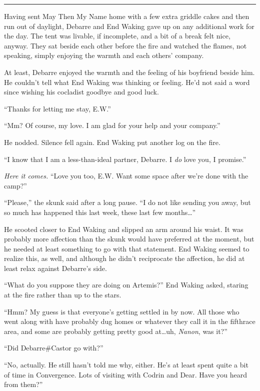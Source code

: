 \begin{center}\rule{0.5\linewidth}{0.5pt}\end{center}

Having sent May Then My Name home with a few extra griddle cakes and then run out of daylight, Debarre and End Waking gave up on any additional work for the day. The tent was livable, if incomplete, and a bit of a break felt nice, anyway. They sat beside each other before the fire and watched the flames, not speaking, simply enjoying the warmth and each others' company.

At least, Debarre enjoyed the warmth and the feeling of his boyfriend beside him. He couldn't tell what End Waking was thinking or feeling. He'd not said a word since wishing his cocladist goodbye and good luck.

``Thanks for letting me stay, E.W.''

``Mm? Of course, my love. I am glad for your help and your company.''

He nodded. Silence fell again. End Waking put another log on the fire.

``I know that I am a less-than-ideal partner, Debarre. I \emph{do} love you, I promise.''

\emph{Here it comes.} ``Love you too, E.W. Want some space after we're done with the camp?''

``Please,'' the skunk said after a long pause. ``I do not like sending you away, but so much has happened this last week, these last few months\ldots{}''

He scooted closer to End Waking and slipped an arm around his waist. It was probably more affection than the skunk would have preferred at the moment, but he needed at least something to go with that statement. End Waking seemed to realize this, as well, and although he didn't reciprocate the affection, he did at least relax against Debarre's side.

``What do you suppose they are doing on Artemis?'' End Waking asked, staring at the fire rather than up to the stars.

``Hmm? My guess is that everyone's getting settled in by now. All those who went along with have probably dug homes or whatever they call it in the fifthrace area, and some are probably getting pretty good at\ldots uh, \emph{Nanon}, was it?''

``Did Debarre\#Castor go with?''

``No, actually. He still hasn't told me why, either. He's at least spent quite a bit of time in Convergence. Lots of visiting with Codrin and Dear. Have you heard from them?''

